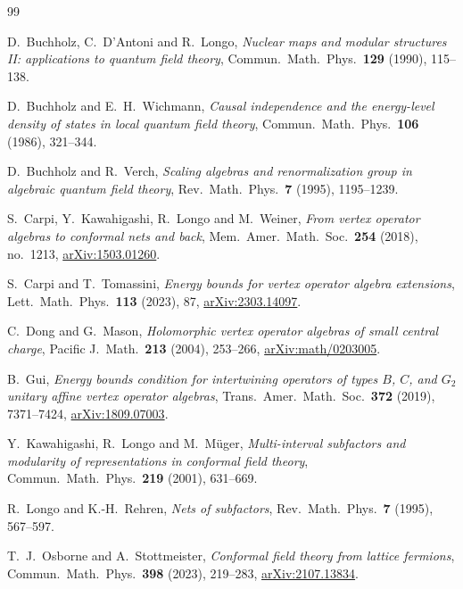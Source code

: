 \begin{thebibliography}{99}

D.~Buchholz, C.~D'Antoni and R.~Longo,
\emph{Nuclear maps and modular structures II: applications to quantum
field theory},
Commun.\ Math.\ Phys.\ \textbf{129} (1990), 115--138.

D.~Buchholz and E.~H.~Wichmann,
\emph{Causal independence and the energy-level density of states in
local quantum field theory},
Commun.\ Math.\ Phys.\ \textbf{106} (1986), 321--344.

D.~Buchholz and R.~Verch,
\emph{Scaling algebras and renormalization group in algebraic quantum
field theory},
Rev.\ Math.\ Phys.\ \textbf{7} (1995), 1195--1239.

S.~Carpi, Y.~Kawahigashi, R.~Longo and M.~Weiner,
\emph{From vertex operator algebras to conformal nets and back},
Mem.\ Amer.\ Math.\ Soc.\ \textbf{254} (2018), no.~1213,
\href{https://arxiv.org/abs/1503.01260}{arXiv:1503.01260}.

S.~Carpi and T.~Tomassini,
\emph{Energy bounds for vertex operator algebra extensions},
Lett.\ Math.\ Phys.\ \textbf{113} (2023), 87,
\href{https://arxiv.org/abs/2303.14097}{arXiv:2303.14097}.

C.~Dong and G.~Mason,
\emph{Holomorphic vertex operator algebras of small central charge},
Pacific J.\ Math.\ \textbf{213} (2004), 253--266,
\href{https://arxiv.org/abs/math/0203005}{arXiv:math/0203005}.

B.~Gui,
\emph{Energy bounds condition for intertwining operators of types
$B$, $C$, and $G_2$ unitary affine vertex operator algebras},
Trans.\ Amer.\ Math.\ Soc.\ \textbf{372} (2019), 7371--7424,
\href{https://arxiv.org/abs/1809.07003}{arXiv:1809.07003}.

Y.~Kawahigashi, R.~Longo and M.~M\"uger,
\emph{Multi-interval subfactors and modularity of representations in
conformal field theory},
Commun.\ Math.\ Phys.\ \textbf{219} (2001), 631--669.

R.~Longo and K.-H.~Rehren,
\emph{Nets of subfactors},
Rev.\ Math.\ Phys.\ \textbf{7} (1995), 567--597.

T.~J.~Osborne and A.~Stottmeister,
\emph{Conformal field theory from lattice fermions},
Commun.\ Math.\ Phys.\ \textbf{398} (2023), 219--283,
\href{https://arxiv.org/abs/2107.13834}{arXiv:2107.13834}.


\end{thebibliography}
